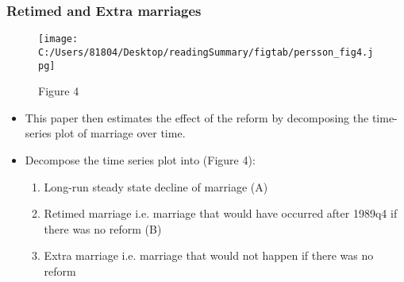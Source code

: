 \documentclass[a4paper, 12pt]{article}
\begin{document}
\subsubsection{Retimed and Extra marriages}
\begin{figure}[h!]
\center
\texttt{[image: C:/Users/81804/Desktop/readingSummary/figtab/persson\_fig4.jpg]}
\caption*{Figure 4}
\end{figure}

\begin{itemize}
\item This paper then estimates the effect of the reform by decomposing the time-series plot of marriage over time.
\item Decompose the time series plot into (Figure 4):
\begin{enumerate}
\item Long-run steady state decline of marriage (A)
\item Retimed marriage i.e. marriage that would have occurred after 1989q4 if there was no reform (B)
\item Extra marriage i.e. marriage that would not happen if there was no reform
\end{enumerate}


\end{itemize}
\end{document}
